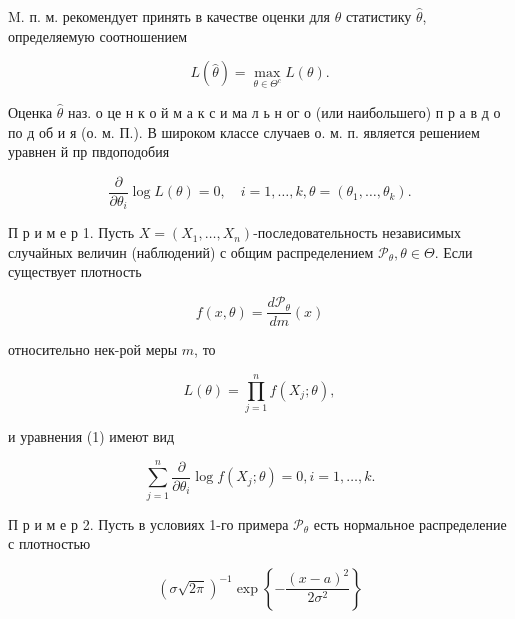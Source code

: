 \documentclass[10pt]{article}
\begin{document}
M. п. м. рекомендует принять в качестве оценки для $\theta$ статистику $\hat{\theta}$, определяемую соотношением



\[

L(\hat{\theta})=\max _{\theta \in \Theta^{c}} L(\theta) .

\]



Оценка $\hat{\theta}$ наз. о це н к о й м а к с и ма л ь н ог о (или наибольшего) п р а в д о по д об и я (о. м. П.). В широком классе случаев о. м. п. является решением уравнен й пр пвдоподобия



\[

\frac{\partial}{\partial \theta_{i}} \log L(\theta)=0, \quad i=1, \ldots, k, \theta=\left(\theta_{1}, \ldots, \theta_{k}\right) .

\]



П р и м е р 1. Пусть $X=\left(X_{1}, \ldots, X_{n}\right)$-последовательность независимых случайных величин (наблюдений) с общим распределением $\mathscr{P}_{\theta}, \theta \in \Theta$. Если существует плотность



\[

f(x, \theta)=\frac{d \mathscr{P}_{\theta}}{d m}(x)

\]



относительно нек-рой меры $m$, то



\[

L(\theta)=\prod_{j=1}^{n} f\left(X_{j} ; \theta\right),

\]



и уравнения (1) имеют вид



\[

\sum_{j=1}^{n} \frac{\partial}{\partial \theta_{i}} \log f\left(X_{j} ; \theta\right)=0, i=1, \ldots, k .

\]



П р и м е р 2. Пусть в условиях 1-го примера $\mathscr{P}_{\theta}$ есть нормальное распределение с плотностью



\[

(\sigma \sqrt{2 \pi})^{-1} \exp \left\{-\frac{(x-a)^{2}}{2 \sigma^{2}}\right\}

\]
\end{document}
